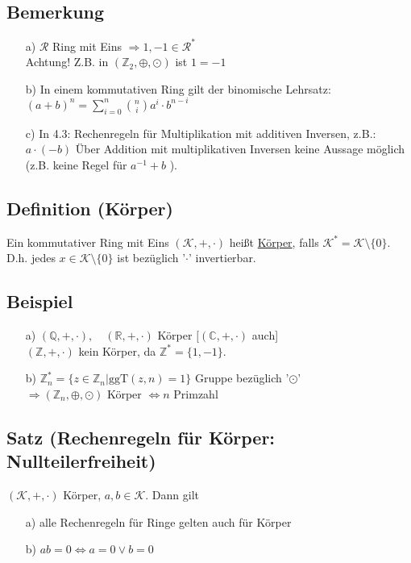 \documentclass[12pt,titlepage, pdf]{article}
\newcommand{\uline}[1]{\underline{#1}}
\renewcommand{\>}{\rightarrow}
\renewcommand{\*}{\cdot}
\begin{document}
\subsection{Bemerkung}
\begin{itemize}
	\item[a)] $\mathcal{R}$ Ring mit Eins $\Rightarrow 1, -1 \in \mathcal{R}^*$ \\
	Achtung! Z.B. in $(\mathbb{Z}_2, \oplus, \odot)$ ist $1 = -1$
	\item[b)] In einem kommutativen Ring gilt der binomische Lehrsatz:\\
	$(a+b)^n = \sum_{i = 0}^{n} {n\choose{i}} a^i \cdot b^{n-i}$
	\item[c)] In 4.3: Rechenregeln für Multiplikation mit additiven Inversen, z.B.: $a\cdot(-b)$ Über Addition mit multiplikativen Inversen keine Aussage möglich (z.B. keine Regel für $a^{-1}+b$ ).
\end{itemize}

\subsection{Definition (Körper)}
Ein kommutativer Ring mit Eins $(\mathcal{K}, +, \cdot)$ heißt \uline{Körper}, falls $\mathcal{K}^* = \mathcal{K} \setminus \{0\}$. D.h. jedes $x \in \mathcal{K} \setminus \{0\}$ ist bezüglich '$\cdot$' invertierbar.

\subsection{Beispiel}
\begin{itemize}
	\item[a)] $(\mathbb{Q},+,\cdot),\quad (\mathbb{R},+,\cdot)$ Körper $[(\mathbb{C},+,\cdot)$ auch] \\
	$(\mathbb{Z},+,\cdot)$ kein Körper, da $\mathbb{Z}^* = \{1,-1\}$.
	\item[b)] $\mathbb{Z}_n^* = \{z \in \mathbb{Z}_n| \text{ggT}(z,n) = 1\}$ Gruppe bezüglich '$\odot$'\\
	$\Rightarrow (\mathbb{Z}_n, \oplus, \odot)$ Körper $\Leftrightarrow n$ Primzahl
\end{itemize}

\subsection{Satz (Rechenregeln für Körper: Nullteilerfreiheit)}	
$(\mathcal{K},+,\cdot)$ Körper, $a,b \in \mathcal{K}$. Dann gilt
\begin{itemize}
	\item[a)] alle Rechenregeln für Ringe gelten auch für Körper
	\item[b)] $ab = 0 \Leftrightarrow a = 0\vee b = 0$ \qquad [Gegenbeispiel: $(\mathbb{Z}_6, \oplus, \odot)$, weil $2 \odot 3 = 0$]
\end{itemize}
\end{document}
